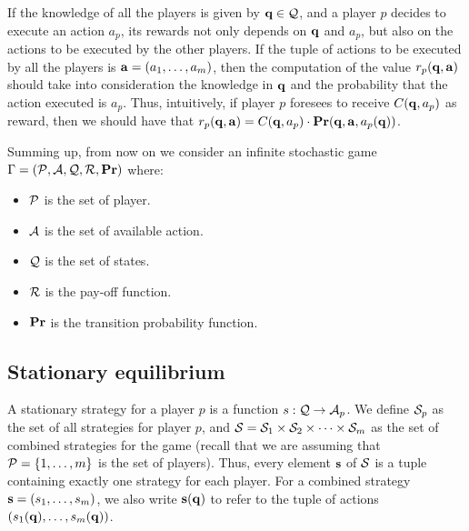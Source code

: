 If the knowledge of all the players is given by $\mathbf{q} \in \mathcal{Q}$, and a player $p$ decides to execute an action $a_p$, its rewards not only depends on $\mathbf{q}$ and $a_p$, but also on the actions to be executed by the other players. If the tuple of actions to be executed by all the players is $\mathbf{a} = (a_1, \ldots, a_m)$, then the computation of the value $r_p(\mathbf{q}, \mathbf{a})$ should take into consideration the knowledge in $\mathbf{q}$ and the probability that the action executed is $a_p$. Thus, intuitively, if player $p$ foresees to receive $C(\mathbf{q}, a_p)$ as reward, then we should have that $r_p(\mathbf{q}, \mathbf{a}) = C(\mathbf{q}, a_p) \cdot \mathbf{Pr}(\mathbf{q}, \mathbf{a}, a_p(\mathbf{q}))$.


Summing up, from now on we consider an infinite stochastic game $\Gamma = (\mathcal{P},\mathcal{A},\mathcal{Q},\mathcal{R},\mathbf{Pr})$ where:
\begin{itemize}
	\item $\mathcal{P}$ is the set of player.
	\item $\mathcal{A}$ is the set of available action.
	\item $\mathcal{Q}$ is the set of states.
	\item $\mathcal{R}$ is the pay-off function.
	\item $\mathbf{Pr}$ is the transition probability function.
\end{itemize} 


\subsection{Stationary equilibrium}

A stationary strategy for a player $p$ is a function $s : \mathcal{Q} \rightarrow \mathcal{A}_p$. 
We define $\mathcal{S}_p$ as the set of all strategies for player $p$, and $\mathcal{S} = \mathcal{S}_{1} \times \mathcal{S}_{2} \times \cdots \times \mathcal{S}_{m}$ as the set of combined strategies for the game (recall that we are assuming that $\mathcal{P} = \{1, \ldots, m\}$ is the set of players). Thus, every element $\mathbf{s}$ of $\mathcal{S}$ is a tuple containing exactly one strategy for each player. 
For a combined strategy $\mathbf{s} = (s_1, \ldots, s_m)$, 
we also write $\mathbf{s}(\mathbf{q})$ to refer to the tuple of actions $(s_1(\mathbf{q}), \ldots, s_m(\mathbf{q}))$. 


